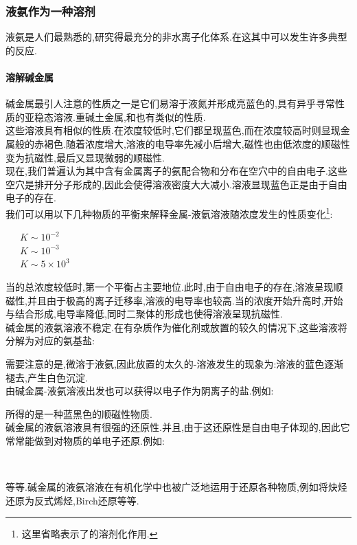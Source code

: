 \documentclass{ctexart}
\begin{document}
\subsubsection{液氨作为一种溶剂}
液氨是人们最熟悉的,研究得最充分的非水离子化体系.在这其中可以发生许多典型的反应.
\paragraph{溶解碱金属}
碱金属最引人注意的性质之一是它们易溶于液氮并形成亮蓝色的,具有异乎寻常性质的亚稳态溶液.重碱土金属,和也有类似的性质.\\
\indent 这些溶液具有相似的性质.在浓度较低时,它们都呈现蓝色,而在浓度较高时则显现金属般的赤褐色.随着浓度增大,溶液的电导率先减小后增大,磁性也由低浓度的顺磁性变为抗磁性,最后又显现微弱的顺磁性.\\
\indent 现在,我们普遍认为其中含有金属离子的氨配合物和分布在空穴中的自由电子.这些空穴是排开分子形成的,因此会使得溶液密度大大减小.溶液显现蓝色正是由于自由电子的存在.\\
\indent 我们可以用以下几种物质的平衡来解释金属-液氨溶液随浓度发生的性质变化\footnote{这里省略表示了的溶剂化作用.}:
\begin{center}
    \ \ \ $K\sim10^{-2}$\\
    \ \ \ $K\sim10^{-3}$\\
    \ \ \ $K\sim5\times10^{3}$
\end{center}
当的总浓度较低时,第一个平衡占主要地位.此时,由于自由电子的存在,溶液呈现顺磁性,并且由于极高的离子迁移率,溶液的电导率也较高.当的浓度开始升高时,开始与结合形成,电导率降低,同时二聚体的形成也使得溶液呈现抗磁性.\\
\indent 碱金属的液氨溶液不稳定.在有杂质作为催化剂或放置的较久的情况下,这些溶液将分解为对应的氨基盐:
\begin{center}
\end{center}
需要注意的是,微溶于液氨,因此放置的太久的-溶液发生的现象为:溶液的蓝色逐渐褪去,产生白色沉淀.\\
\indent 由碱金属-液氨溶液出发也可以获得以电子作为阴离子的盐.例如:
\begin{center}
\end{center}
所得的是一种蓝黑色的顺磁性物质.\\
\indent 碱金属的液氨溶液具有很强的还原性.并且,由于这还原性是自由电子体现的,因此它常常能做到对物质的单电子还原.例如:
\begin{center}
    \\
\end{center}
等等.碱金属的液氨溶液在有机化学中也被广泛地运用于还原各种物质,例如将炔烃还原为反式烯烃,Birch还原等等.
\end{document}
